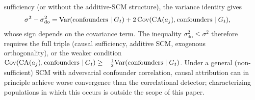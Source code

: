 \begin{proposition}
\begin{enumerate}
    sufficiency (or without the additive-SCM structure), the
    variance identity gives
    \[
        \sigma^2 - \sigma_{\mathrm{do}}^2
        = \mathrm{Var}(\text{confounders} \mid G_t)
        + 2\,\mathrm{Cov}(\mathrm{CA}(a_j), \mathrm{confounders} \mid G_t),
    \]
    whose sign depends on the covariance term. The inequality
    $\sigma_{\mathrm{do}}^2 \leq \sigma^2$ therefore requires the
    full triple (causal sufficiency, additive SCM, exogenous
    orthogonality), or the weaker condition
    $\mathrm{Cov}(\mathrm{CA}(a_j), \mathrm{confounders} \mid G_t)
        \geq -\tfrac{1}{2} \mathrm{Var}(\text{confounders} \mid G_t)$.
    Under a general (non-sufficient) SCM with adversarial confounder
    correlation, causal attribution can in principle achieve worse
    convergence than the correlational detector; characterizing
    populations in which this occurs is outside the scope of this
    paper.
\end{enumerate}
\end{proposition}

